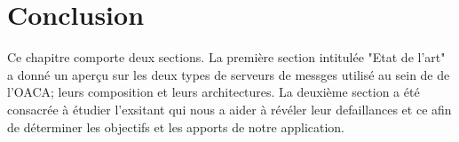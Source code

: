 \section*{Conclusion}
Ce chapitre comporte deux sections. La première section intitulée "Etat de l'art" a donné un aperçu sur les deux types de serveurs de messges utilisé au sein de de l'OACA; leurs composition et leurs architectures. La deuxième section a été consacrée à étudier l'exsitant qui nous a aider à révéler leur defaillances et ce afin de déterminer les objectifs et les apports de notre application.
  









